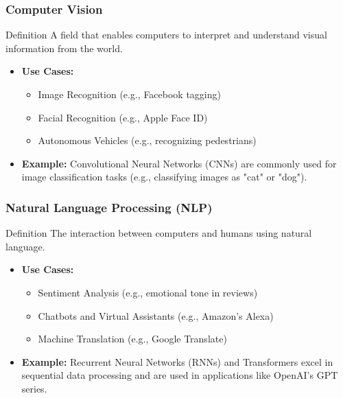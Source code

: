 \documentclass[aspectratio=169]{beamer}
\begin{document}
\begin{frame}[fragile]
    \frametitle{Computer Vision}
    \begin{block}{Definition}
        A field that enables computers to interpret and understand visual information from the world.
    \end{block}
    \begin{itemize}
        \item \textbf{Use Cases:}
            \begin{itemize}
                \item Image Recognition (e.g., Facebook tagging)
                \item Facial Recognition (e.g., Apple Face ID)
                \item Autonomous Vehicles (e.g., recognizing pedestrians)
            \end{itemize}
        \item \textbf{Example:} 
            Convolutional Neural Networks (CNNs) are commonly used for image classification tasks (e.g., classifying images as "cat" or "dog").
    \end{itemize}
\end{frame}

\begin{frame}[fragile]
    \frametitle{Natural Language Processing (NLP)}
    \begin{block}{Definition}
        The interaction between computers and humans using natural language.
    \end{block}
    \begin{itemize}
        \item \textbf{Use Cases:}
            \begin{itemize}
                \item Sentiment Analysis (e.g., emotional tone in reviews)
                \item Chatbots and Virtual Assistants (e.g., Amazon's Alexa)
                \item Machine Translation (e.g., Google Translate)
            \end{itemize}
        \item \textbf{Example:} 
            Recurrent Neural Networks (RNNs) and Transformers excel in sequential data processing and are used in applications like OpenAI's GPT series.
    \end{itemize}
\end{frame}
\end{document}
